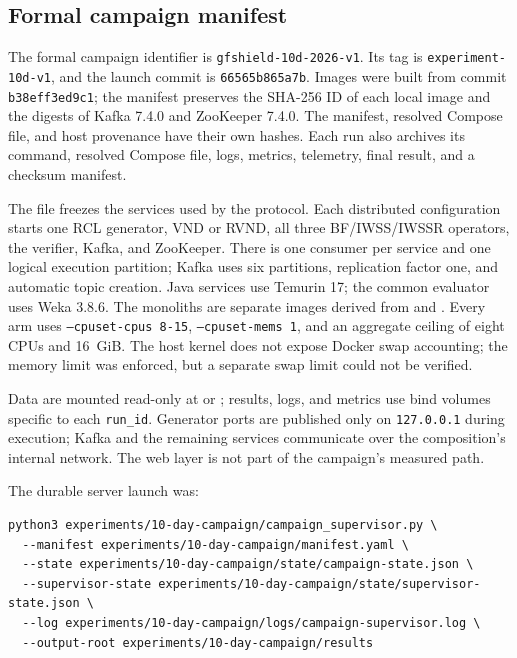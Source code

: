 \subsection{Formal campaign manifest}

The formal campaign identifier is \texttt{gfshield-10d-2026-v1}. Its tag is \texttt{experiment-10d-v1}, and the launch commit is \texttt{66565b865a7b}. Images were built from commit \texttt{b38eff3ed9c1}; the manifest preserves the SHA-256 ID of each local image and the digests of Kafka 7.4.0 and ZooKeeper 7.4.0. The manifest, resolved Compose file, and host provenance have their own hashes. Each run also archives its command, resolved Compose file, logs, metrics, telemetry, final result, and a checksum manifest.

The file  freezes the services used by the protocol. Each distributed configuration starts one RCL generator, VND or RVND, all three BF/IWSS/IWSSR operators, the verifier, Kafka, and ZooKeeper. There is one consumer per service and one logical execution partition; Kafka uses six partitions, replication factor one, and automatic topic creation. Java services use Temurin 17; the common evaluator uses Weka 3.8.6. The monoliths are separate images derived from  and . Every arm uses \texttt{--cpuset-cpus 8-15}, \texttt{--cpuset-mems 1}, and an aggregate ceiling of eight CPUs and 16~GiB. The host kernel does not expose Docker swap accounting; the memory limit was enforced, but a separate swap limit could not be verified.

Data are mounted read-only at  or ; results, logs, and metrics use bind volumes specific to each \texttt{run\_id}. Generator ports are published only on \texttt{127.0.0.1} during execution; Kafka and the remaining services communicate over the composition's internal network. The web layer is not part of the campaign's measured path.

The durable server launch was:

\begin{lstlisting}[basicstyle=\ttfamily\footnotesize,breaklines=true,columns=fullflexible]
python3 experiments/10-day-campaign/campaign_supervisor.py \
  --manifest experiments/10-day-campaign/manifest.yaml \
  --state experiments/10-day-campaign/state/campaign-state.json \
  --supervisor-state experiments/10-day-campaign/state/supervisor-state.json \
  --log experiments/10-day-campaign/logs/campaign-supervisor.log \
  --output-root experiments/10-day-campaign/results
\end{lstlisting}

